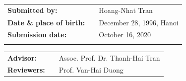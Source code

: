 \vspace{3.0cm}
\begin{center}
\begin{flushleft}
\small
\renewcommand{\arraystretch}{1.5} 
\begin{tabular}{lll}
    \textbf{Submitted by:} & & Hoang-Nhat Tran\\
    \textbf{Date \& place of birth:} & & December 28, 1996, Hanoi\\
    \textbf{Submission date:} & & October 16, 2020 \\
    & & \\
\end{tabular}
\begin{tabular}{lll}
\textbf{Advisor:} & & Assoc. Prof. Dr. Thanh-Hai Tran \\
\textbf{Reviewers:} & & Prof. Van-Hai Duong \\

\end{tabular}
\end{flushleft}
\end{center}
